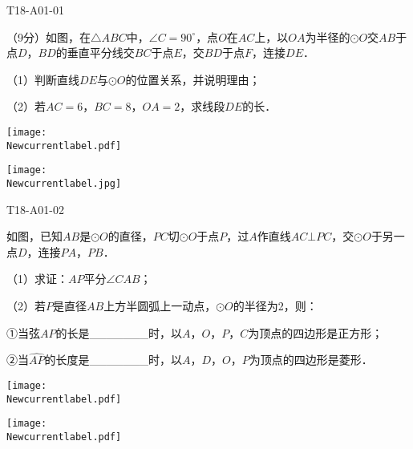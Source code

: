 
\begin{defproblem}{T18-A01-01}%
\begin{onlyproblem}%
（9分）如图，在$\triangle ABC$中，$\angle C=90^{\circ}$，点$O$在$AC$上，以$OA$为半径的$\odot O$交$AB$于点$D$，$BD$的垂直平分线交$BC$于点$E$，交$BD$于点$F$，连接$DE$．


（1）判断直线$DE$与$\odot O$的位置关系，并说明理由；

（2）若$AC=6$，$BC=8$，$OA=2$，求线段$DE$的长．

\vspace*{2\baselineskip}
\texttt{[image: \\Newcurrentlabel.pdf]}


\end{onlyproblem}%
\begin{onlysolution}%
\texttt{[image: \\Newcurrentlabel.jpg]}

\end{onlysolution}%
\end{defproblem}



\begin{defproblem}{T18-A01-02}%
\begin{onlyproblem}%
如图，已知$AB$是$\odot O$的直径，$PC$切$\odot O$于点$P$，过$A$作直线$AC\bot PC$，交$\odot O$于另一点$D$，连接$PA$，$PB$．

（1）求证：$AP$平分$\angle CAB$；

（2）若$P$是直径$AB$上方半圆弧上一动点，$\odot O$的半径为2，则：

①当弦$AP$的长是{\_}{\_}{\_}{\_}{\_}{\_}{\_}时，以$A$，$O$，$P$，$C$为顶点的四边形是正方形；

②当$\widehat{AP}$的长度是{\_}{\_}{\_}{\_}{\_}{\_}{\_}时，以$A$，$D$，$O$，$P$为顶点的四边形是菱形．

\vspace*{-\baselineskip}
\texttt{[image: \\Newcurrentlabel.pdf]}


\end{onlyproblem}%
\begin{onlysolution}%
\begin{center}
\texttt{[image: \\Newcurrentlabel.pdf]}
\end{center}
\end{onlysolution}%
\end{defproblem}


